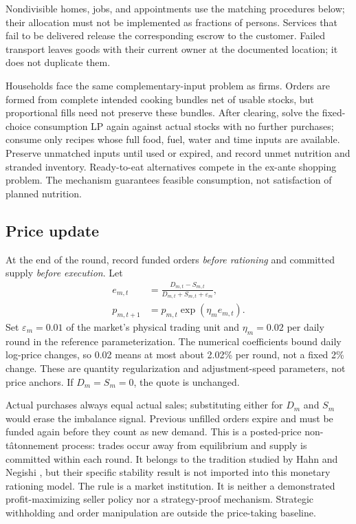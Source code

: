 \documentclass[10pt,a4paper,twocolumn]{article}
\begin{document}
Nondivisible homes, jobs, and appointments use the matching procedures
below; their allocation must not be implemented as fractions of persons.
Services that fail to be delivered release the corresponding escrow to
the customer. Failed transport leaves goods with their current owner at
the documented location; it does not duplicate them.

Households face the same complementary-input problem as firms. Orders
are formed from complete intended cooking bundles net of usable stocks,
but proportional fills need not preserve these bundles. After clearing,
solve the fixed-choice consumption LP again against actual stocks with
no further purchases; consume only recipes whose full food, fuel, water
and time inputs are available. Preserve unmatched inputs until used or
expired, and record unmet nutrition and stranded inventory. Ready-to-eat
alternatives compete in the ex-ante shopping problem. The mechanism
guarantees feasible consumption, not satisfaction of planned nutrition.

\subsection{Price update}
At the end of the round, record funded orders \emph{before rationing} and
committed supply \emph{before execution}. Let
\begin{align}
 e_{m,t}&=\frac{D_{m,t}-S_{m,t}}
 {D_{m,t}+S_{m,t}+\varepsilon_m},\label{eq:imbalance}\\
 p_{m,t+1}&=p_{m,t}\exp(\eta_m e_{m,t}).
 \label{eq:price}
\end{align}
Set $\varepsilon_m=0.01$ of the market's physical trading unit and
$\eta_m=0.02$ per daily round in the reference parameterization.
The numerical coefficients bound daily log-price changes, so 0.02 means
at most about 2.02\% per round, not a fixed 2\% change.
These are quantity regularization and adjustment-speed parameters, not
price anchors. If $D_m=S_m=0$, the quote is unchanged.

Actual purchases always equal actual sales; substituting either for
$D_m$ and $S_m$ would erase the imbalance signal. Previous unfilled
orders expire and must be funded again before they count as new demand.
This is a posted-price non-t\^atonnement process: trades occur away from
equilibrium and supply is committed within each round. It belongs to the
tradition studied by Hahn and Negishi \cite{hahn1962}, but their specific
stability result is not imported into this monetary rationing model.
The rule is a market institution. It is neither a demonstrated
profit-maximizing seller policy nor a strategy-proof mechanism. Strategic
withholding and order manipulation are outside the price-taking baseline.
\end{document}
